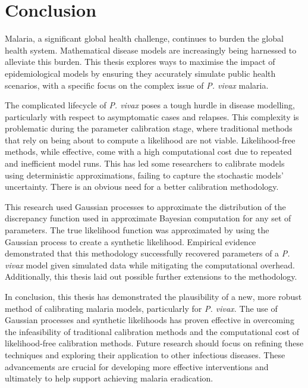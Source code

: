 \chapter{Conclusion}

Malaria, a significant global health challenge, continues to burden the 
global health system. Mathematical disease models are increasingly being 
harnessed to alleviate this burden. This thesis explores ways to maximise 
the impact of epidemiological models by ensuring they accurately simulate 
public health scenarios, with a specific focus on the complex issue of 
\textit{P. vivax} malaria. 

The complicated lifecycle of \textit{P. vivax} poses a tough hurdle in 
disease modelling,
particularly with respect to asymptomatic cases and relapses.
This complexity is problematic during the parameter 
calibration stage, where traditional methods that rely on being about to 
compute a likelihood are not viable. Likelihood-free methods, while effective, 
come with a high computational cost due to repeated and inefficient model runs. 
This has led some researchers to calibrate models using deterministic 
approximations, failing to capture the stochastic models' uncertainty. 
There is an obvious need for a better calibration methodology.

This research used Gaussian processes to approximate the distribution of the 
discrepancy function used in approximate Bayesian computation for any set of 
parameters. The true likelihood function was approximated by using the 
Gaussian process to create a synthetic likelihood. Empirical evidence 
demonstrated that this methodology successfully recovered parameters of a 
\textit{P. vivax} model given simulated data while mitigating the 
computational overhead. Additionally, this thesis laid out possible further 
extensions to the methodology.

In conclusion, this thesis has demonstrated the plausibility of a new, 
more robust method of calibrating malaria models, particularly for 
\textit{P. vivax.} The use of Gaussian processes and synthetic likelihoods has 
proven effective in overcoming the infeasibility of traditional calibration 
methods and the computational cost of likelihood-free calibration methods. 
Future research should focus on refining these techniques and exploring their 
application to other infectious diseases. These advancements are crucial for 
developing more effective interventions and ultimately to help support 
achieving malaria eradication.